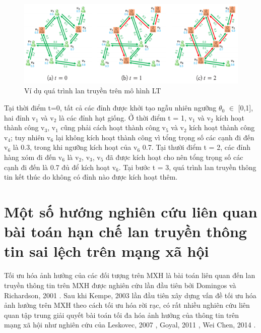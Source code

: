 	\begin{center}
		\begin{figure}[H]
			\begin{center}
				\includegraphics [scale=1]{picture/Hinh2_2}
			\end{center}
			\caption{Ví dụ quá trình lan truyền trên mô hình LT}
			\label{refhinh2_2}
		\end{figure}
	\end{center}	
	Tại thời điểm t=0, tất cả các đỉnh được khởi tạo ngẫu nhiên ngưỡng $\theta$$_{0}$ $\in$ [0,1], hai đỉnh v$_{1}$ và v$_{2}$ là các đỉnh hạt giống. Ở thời điểm t = 1, v$_{1}$ và v$_{2}$ kích hoạt thành công v$_{3}$, v$_{1}$ cũng phải cách hoạt thành công v$_{5}$ và v$_{2}$ kích hoạt thành công v$_{4}$; tuy nhiên v$_{6}$ lại không kích hoạt thành công vì tổng trọng số các cạnh đi đến v$_{6}$ là 0.3, trong khi ngưỡng kích hoạt của v$_{6}$ 0.7. Tại thười điểm t = 2, các đỉnh hàng xóm đi đến v$_{6}$ là v$_{2}$, v$_{3}$, v$_{5}$ đã được kích hoạt cho nên tổng trọng số các cạnh đi đến là 0.7 đủ để kích hoạt v$_{6}$. Tại bước t = 3, quá trình lan truyền thông tin kết thúc do không có đỉnh nào được kích hoạt thêm.

\section{Một số hướng nghiên cứu liên quan bài toán hạn chế lan truyền thông tin sai lệch trên mạng xã hội}
Tối ưu hóa ảnh hưởng của các đối tượng trên MXH là bài toán liên quan đến lan truyền thông tin trên MXH được nghiên cứu lần đầu tiên bởi Domingos và Richardson, 2001 \cite{pedro}. Sau khi Kempe, 2003 \cite{kemple1} lần đầu tiên xây dựng vấn đề tối ưu hóa ảnh hưởng trên MXH theo cách tối ưu hóa rời rạc, có rất nhiều nghiên cứu liên quan tập trung giải quyết bài toán tối đa hóa ảnh hưởng của thông tin trên mạng xã hội như nghiên cứu của Leskovec, 2007 \cite{leskovec}, Goyal, 2011 \cite{goyal}, Wei Chen, 2014 \cite{chen}.

